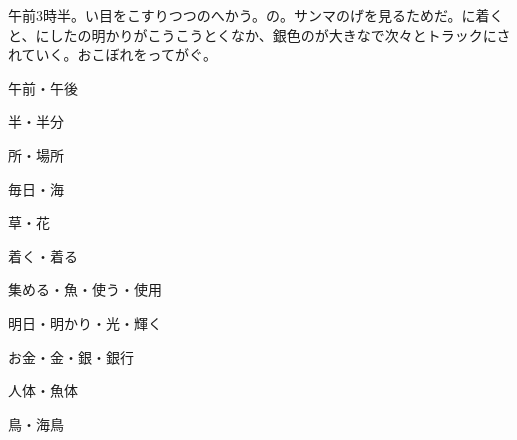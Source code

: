 
\author{Tomislav Mamić}
\modulolinenumbers[1]

	
	
	\begin{bunshou}
		午前3時半。い目をこすりつつのへかう。\hspace{20pt}\hspace{20pt}の\hspace{10pt}。\hspace{20pt}サンマのげを見るためだ。に着くと、にしたの明かりがこうこうとくなか、銀色のが大きなで次々とトラックにされていく。おこぼれをってがぐ。
	\end{bunshou}

	
	\begin{hyou}
		\item 午前・午後
		\item 半・半分
		\item 所・場所
		\item 毎日・海
		\item 草・花
		\item 着く・着る
		\item 集める・魚・使う・使用
		\item 明日・明かり・光・輝く
		\item お金・金・銀・銀行
		\item 人体・魚体
		\item 鳥・海鳥
	\end{hyou}

